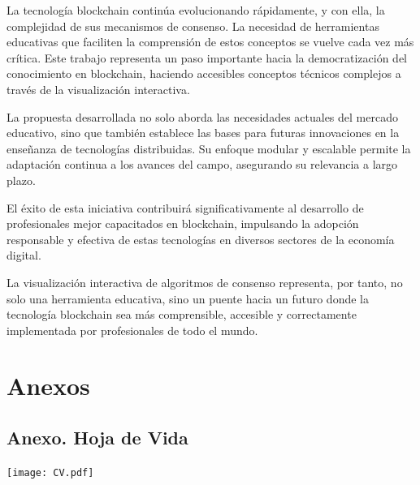 \documentclass[spanish,12pt,letterpaper]{report}
\begin{document}
La tecnología blockchain continúa evolucionando rápidamente, y con ella, la complejidad de sus mecanismos de consenso. La necesidad de herramientas educativas que faciliten la comprensión de estos conceptos se vuelve cada vez más crítica. Este trabajo representa un paso importante hacia la democratización del conocimiento en blockchain, haciendo accesibles conceptos técnicos complejos a través de la visualización interactiva.

La propuesta desarrollada no solo aborda las necesidades actuales del mercado educativo, sino que también establece las bases para futuras innovaciones en la enseñanza de tecnologías distribuidas. Su enfoque modular y escalable permite la adaptación continua a los avances del campo, asegurando su relevancia a largo plazo.

El éxito de esta iniciativa contribuirá significativamente al desarrollo de profesionales mejor capacitados en blockchain, impulsando la adopción responsable y efectiva de estas tecnologías en diversos sectores de la economía digital.

La visualización interactiva de algoritmos de consenso representa, por tanto, no solo una herramienta educativa, sino un puente hacia un futuro donde la tecnología blockchain sea más comprensible, accesible y correctamente implementada por profesionales de todo el mundo.

\pagestyle{plain} 
\printbibliography

\section*{Anexos}

\subsection*{Anexo. Hoja de Vida}

\thispagestyle{empty}

\begin{center}
\texttt{[image: CV.pdf]}
\end{center}
\end{document}
